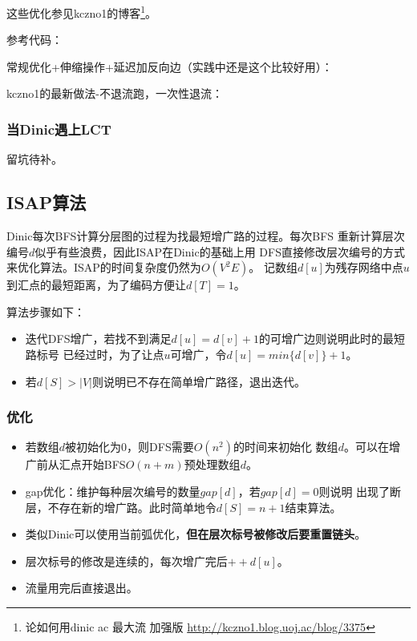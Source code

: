 这些优化参见kczno1的博客\footnote{
	论如何用dinic ac 最大流 加强版
	\url{http://kczno1.blog.uoj.ac/blog/3375}}。

参考代码：

常规优化+伸缩操作+延迟加反向边（实践中还是这个比较好用）：


kczno1的最新做法-不退流跑，一次性退流：


\subsubsection{当Dinic遇上LCT}

留坑待补。

\subsection{ISAP算法}

Dinic每次BFS计算分层图的过程为找最短增广路的过程。每次BFS
重新计算层次编号$d$似乎有些浪费，因此ISAP在Dinic的基础上用
DFS直接修改层次编号的方式来优化算法。ISAP的时间复杂度仍然为$O(V^2E)$。
记数组$d[u]$为残存网络中点$u$到汇点的最短距离，为了编码方便让$d[T]=1$。

算法步骤如下：
\begin{itemize}
	\item 迭代DFS增广，若找不到满足$d[u]=d[v]+1$的可增广边则说明此时的最短路标号
	已经过时，为了让点$u$可增广，令$d[u]=min\{d[v]\}+1$。
	\item 若$d[S]>|V|$则说明已不存在简单增广路径，退出迭代。
\end{itemize}

\subsubsection{优化}
\begin{itemize}
	\item 若数组$d$被初始化为0，则DFS需要$O(n^2)$的时间来初始化
	数组$d$。可以在增广前从汇点开始BFS$O(n+m)$预处理数组$d$。
	\item gap优化：维护每种层次编号的数量$gap[d]$，若$gap[d]=0$则说明
	出现了断层，不存在新的增广路。此时简单地令$d[S]=n+1$结束算法。
	\item 类似Dinic可以使用当前弧优化，{\bfseries 但在层次标号被修改后要重置链头}。
	\item 层次标号的修改是连续的，每次增广完后$++d[u]$。
	\item 流量用完后直接退出。
\end{itemize}

